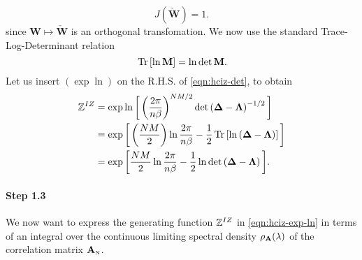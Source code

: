 \begin{equation}\label{eqn:Jacobian}
    J(\mathbf{\check{W}})=1  .
\end{equation}
since $\mathbf{W} \mapsto \check{\mathbf{W}}$  is an orthogonal transfomation.
We now use the standard Trace-Log-Determinant relation~\cite{EngelAndVanDenBroeck}
\begin{equation}\label{eqn:tr-ln-det}
    \mbox{}\operatorname{Tr}\left[\ln\mathbf{M}\right]=\ln\det\mathbf{M}  .
\end{equation}
Let us insert $(\exp\ln)$ on the R.H.S. of \ref{eqn:hciz-det}, to obtain
\begin{align}
\nonumber
\mathbb{Z}^{IZ}
  &=\exp\ln\bigg[\left(\dfrac{2\pi}{n\beta}\right)^{NM/2}\det\left(\mathbf{\Delta}-\mathbf{\Lambda}\right)^{-1/2}\bigg] \\ 
\nonumber
  & =\exp\bigg[\left(\dfrac{NM}{2}\right)\ln\dfrac{2\pi}{n\beta}-\dfrac{1}{2}\mbox{}\operatorname{Tr}\left[\ln\left(\mathbf{\Delta}-\mathbf{\Lambda}
\right)\right]\bigg] \\ 
\label{eqn:hciz-exp-ln}
  & =\exp\bigg[\dfrac{NM}{2}\ln\dfrac{2\pi}{n\beta}-\dfrac{1}{2}\ln\det\left(\mathbf{\Delta}-\mathbf{\Lambda}\right)\bigg]  .
\end{align}


\paragraph{Step 1.3}
We now want to express
the generating function $\mathbb{Z}^{IZ}$ 
in \ref{eqn:hciz-exp-ln}
in terms of an integral over the continuous limiting spectral density
$\rho_{\mathbf{A}}(\lambda)$ of the correlation matrix ${\mathbf{A}}_{\text{\tiny N}}$.  

